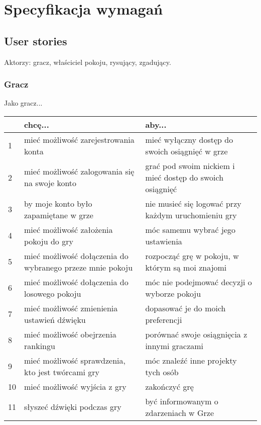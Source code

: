 \chapter{Specyfikacja wymagań}
\section{User stories}
Aktorzy: gracz, właściciel pokoju, rysujący, zgadujący.
\subsection{Gracz}
Jako gracz...
\begin{center}
    \begin{tabular}{ | l || p{5.5cm} | p{5.5cm} |}
    \hline
     & \textbf{chcę...} & \textbf{aby...} \\ \hline \hline
    1 & mieć możliwość zarejestrowania konta & mieć wyłączny dostęp do swoich osiągnięć w grze \\ \hline
    2 & mieć możliwość zalogowania się na swoje konto & grać pod swoim nickiem i mieć dostęp do swoich osiągnięć \\ \hline
    3 & by moje konto było zapamiętane w grze & nie musieć się logować przy każdym uruchomieniu gry \\ \hline
    4 & mieć możliwość założenia pokoju do gry & móc samemu wybrać jego ustawienia \\ \hline
    5 & mieć możliwość dołączenia do wybranego przeze mnie pokoju & rozpocząć grę w pokoju, w którym są moi znajomi \\ \hline
    6 & mieć możliwość dołączenia do losowego pokoju & móc nie podejmować decyzji o wyborze pokoju \\ \hline
    7 & mieć możliwość zmienienia ustawień dźwięku & dopasować je do moich preferencji \\ \hline
    8 & mieć możliwość obejrzenia rankingu & porównać swoje osiągnięcia z innymi graczami \\ \hline
    9 & mieć możliwość sprawdzenia, kto jest twórcami gry & móc znaleźć inne projekty tych osób \\ \hline
    10 & mieć możliwość wyjścia z gry & zakończyć grę \\ \hline
    11 & słyszeć dźwięki podczas gry & być informowanym o zdarzeniach w Grze \\ \hline
    \end{tabular}
\end{center}

